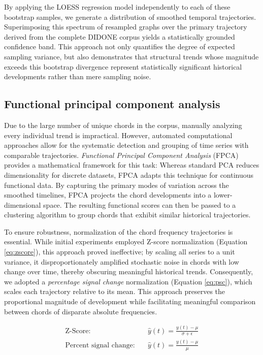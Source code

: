 \documentclass[10pt,a4paper,twocolumn]{article}
\begin{document}
By applying the LOESS regression model independently to each of these bootstrap samples, we generate a distribution of smoothed temporal trajectories. Superimposing this spectrum of resampled graphs over the primary trajectory derived from the complete DIDONE corpus yields a statistically grounded confidence band. This approach not only quantifies the degree of expected sampling variance, but also demonstrates that structural trends whose magnitude exceeds this bootstrap divergence represent statistically significant historical developments rather than mere sampling noise.

\subsection{Functional principal component analysis}
Due to the large number of unique chords in the corpus, manually analyzing every individual trend is impractical. However, automated computational approaches allow for the systematic detection and grouping of time series with comparable trajectories. \textit{Functional Principal Component Analysis} (FPCA) provides a mathematical framework for this task: Whereas standard PCA reduces dimensionality for discrete datasets, FPCA adapts this technique for continuous functional data. By capturing the primary modes of variation across the smoothed timelines, FPCA projects the chord developments into a lower-dimensional space. The resulting functional scores can then be passed to a clustering algorithm to group chords that exhibit similar historical trajectories.

To ensure robustness, normalization of the chord frequency trajectories is essential. While initial experiments employed Z-score normalization (Equation \ref{eq:zscore}), this approach proved ineffective; by scaling all series to a unit variance, it disproportionately amplified stochastic noise in chords with low change over time, thereby obscuring meaningful historical trends. Consequently, we adopted a \textit{percentage signal change} normalization (Equation \ref{eq:psc}), which scales each trajectory relative to its mean. This approach preserves the proportional magnitude of development while facilitating meaningful comparison between chords of disparate absolute frequencies.

\begin{align}
    \text{Z-Score:} \quad & \hat{y}(t) = \frac{y(t) - \mu}{\sigma + \epsilon} \label{eq:zscore} \\[1.5ex]
    \text{Percent signal change:} \quad & \hat{y}(t) = \frac{y(t) - \mu}{\mu} \label{eq:psc}
\end{align}
\end{document}
